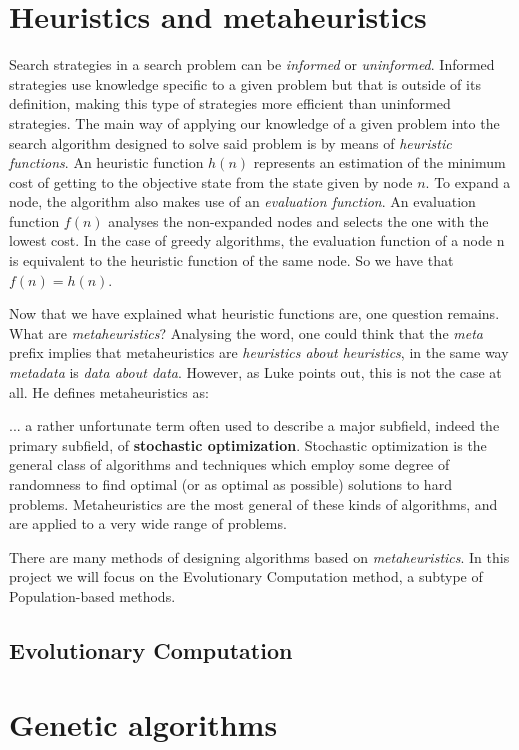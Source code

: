 \section{Heuristics and metaheuristics}

Search strategies in a search problem can be \textit{informed} or \textit{uninformed}. Informed strategies use knowledge specific to a given problem but that is outside of its definition, making this type of strategies more efficient than uninformed strategies. The main way of applying our knowledge of a given problem into the search algorithm designed to solve said problem is by means of \textit{heuristic functions}. An heuristic function $h(n)$ \cite{russellnorvig10ai} represents an estimation of the minimum cost of getting to the objective state from the state given by node $n$. To expand a node, the algorithm also makes use of an \textit{evaluation function}. An evaluation function $f(n)$ analyses the non-expanded nodes and selects the one with the lowest cost. In the case of greedy algorithms, the evaluation function of a node n is equivalent to the heuristic function of the same node. So we have that $f(n) = h(n)$.

Now that we have explained what heuristic functions are, one question remains. What are \textit{metaheuristics}? Analysing the word, one could think that the \textit{meta} prefix implies that metaheuristics are \textit{heuristics about heuristics}, in the same way \textit{metadata} is \textit{data about data}. However, as Luke \cite{luke13metaheuristics} points out, this is not the case at all. He defines metaheuristics as:

\begin{displayquote}
    ... a rather unfortunate term often used to describe a major subfield, indeed the primary subfield, of \textbf{stochastic optimization}. Stochastic optimization is the general class of algorithms and techniques which employ some degree of randomness to find optimal (or as optimal as possible) solutions to hard problems. Metaheuristics are the most general of these kinds of algorithms, and are applied to a very wide range of problems.
\end{displayquote}

There are many methods of designing algorithms based on \textit{metaheuristics}. In this project we will focus on the Evolutionary Computation method, a subtype of Population-based methods.


\subsection{Evolutionary Computation}



\section{Genetic algorithms}



